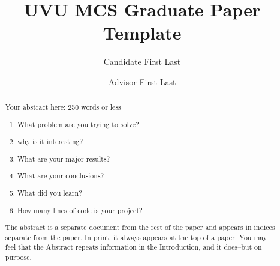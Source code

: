 \documentclass[acmlarge,screen]{acmart}
\begin{document}
\title{UVU MCS Graduate Paper Template}


\author{Candidate First Last}

\author{Advisor First Last}

\renewcommand{\shortauthors}{Candidate First Last}

\begin{abstract}
  Your abstract here: 250 words or less
  \begin{enumerate}
      \item What problem are you trying to solve?
      \item why is it interesting?
      \item What are your major results?
      \item What are your conclusions?
      \item What did you learn?
      \item How many lines of code is your project?
  \end{enumerate}
The abstract is a separate document from the rest of the paper and appears in indices separate from
the paper. In print, it always appears at the top of a paper. You may feel that the Abstract
repeats information in the Introduction, and it does--but on purpose.
\end{abstract}


\maketitle
\end{document}
